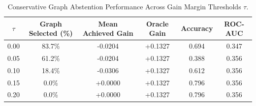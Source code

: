 \begin{table}[t]
\centering
\small
\caption{Conservative Graph Abstention Performance Across Gain Margin Thresholds $\tau$.}
\label{tab:conservative_abstention}
\begin{tabular}{cccccc}
\toprule
\textbf{$\tau$} & \textbf{Graph Selected (\%)} & \textbf{Mean Achieved Gain} & \textbf{Oracle Gain} & \textbf{Accuracy} & \textbf{ROC-AUC} \\
\midrule
0.00 &  83.7\% & -0.0204 & +0.1327 & 0.694 & 0.347 \\
0.05 &  61.2\% & -0.0204 & +0.1327 & 0.388 & 0.356 \\
0.10 &  18.4\% & -0.0306 & +0.1327 & 0.612 & 0.356 \\
0.15 &   0.0\% & +0.0000 & +0.1327 & 0.796 & 0.356 \\
0.20 &   0.0\% & +0.0000 & +0.1327 & 0.796 & 0.356 \\
\bottomrule
\end{tabular}
\end{table}